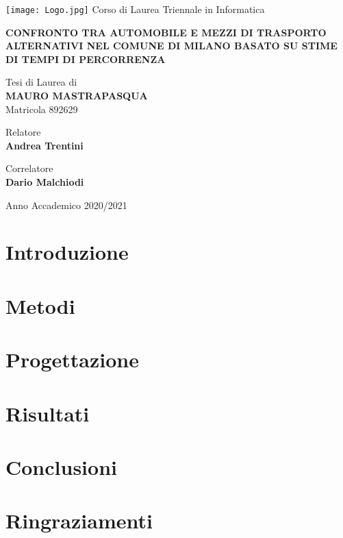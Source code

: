 \documentclass[a4paper,12pt]{report}
\begin{document}
\begin{titlepage}
	\begin{center}
		\texttt{[image: Logo.jpg]}
		\large{Corso di Laurea Triennale in Informatica}
		
		\vspace{1.8cm}
		
		\Large{\textbf{CONFRONTO TRA AUTOMOBILE E MEZZI DI TRASPORTO ALTERNATIVI NEL COMUNE DI MILANO BASATO SU STIME DI TEMPI DI PERCORRENZA}}
		
		\vspace{1.4cm}
		
		\large{Tesi di Laurea di} \\
		\large{\textbf{MAURO MASTRAPASQUA}} \\
		\large{Matricola 892629}
	\end{center}

	\begin{flushleft}
		\vspace{1.4cm}
		
		\normalsize{Relatore} \\
		\normalsize{\textbf{Andrea Trentini}}

		\vspace{0.4cm}

		\normalsize{Correlatore} \\
		\normalsize{\textbf{Dario Malchiodi}}
	\end{flushleft}

	\begin{center}
		\vspace{1.4cm}
		
		\large{Anno Accademico 2020/2021}
	\end{center}
\end{titlepage}

\tableofcontents

\chapter{Introduzione}


\chapter{Metodi}


\chapter{Progettazione}


\chapter{Risultati}


\chapter{Conclusioni}


\chapter{Ringraziamenti}




\end{document}
